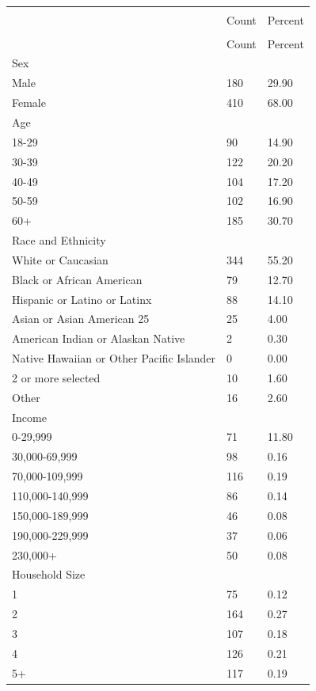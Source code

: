 \documentclass[
  english,
  letterpaper,
]{report}
\begin{document}
\begin{longtable}[]{@{}lll@{}}

\caption{\label{tbl-rccha-demo}Rockland County Community Health
Assessment Demographics}

\tabularnewline

\caption{}\label{T_3f305}\tabularnewline
\toprule\noalign{}
\multicolumn{3}{@{}l@{}}{%
} \\
& Count & Percent \\
\midrule\noalign{}
\endfirsthead
\toprule\noalign{}
\multicolumn{3}{@{}l@{}}{%
} \\
& Count & Percent \\
\midrule\noalign{}
\endhead
\bottomrule\noalign{}
\endlastfoot
Sex & & \\
Male & 180 & 29.90 \\
Female & 410 & 68.00 \\
Age & & \\
18-29 & 90 & 14.90 \\
30-39 & 122 & 20.20 \\
40-49 & 104 & 17.20 \\
50-59 & 102 & 16.90 \\
60+ & 185 & 30.70 \\
Race and Ethnicity & & \\
White or Caucasian & 344 & 55.20 \\
Black or African American & 79 & 12.70 \\
Hispanic or Latino or Latinx & 88 & 14.10 \\
Asian or Asian American 25 & 25 & 4.00 \\
American Indian or Alaskan Native & 2 & 0.30 \\
Native Hawaiian or Other Pacific Islander & 0 & 0.00 \\
2 or more selected & 10 & 1.60 \\
Other & 16 & 2.60 \\
Income & & \\
0-29,999 & 71 & 11.80 \\
30,000-69,999 & 98 & 0.16 \\
70,000-109,999 & 116 & 0.19 \\
110,000-140,999 & 86 & 0.14 \\
150,000-189,999 & 46 & 0.08 \\
190,000-229,999 & 37 & 0.06 \\
230,000+ & 50 & 0.08 \\
Household Size & & \\
1 & 75 & 0.12 \\
2 & 164 & 0.27 \\
3 & 107 & 0.18 \\
4 & 126 & 0.21 \\
5+ & 117 & 0.19 \\

\end{longtable}
\end{document}
